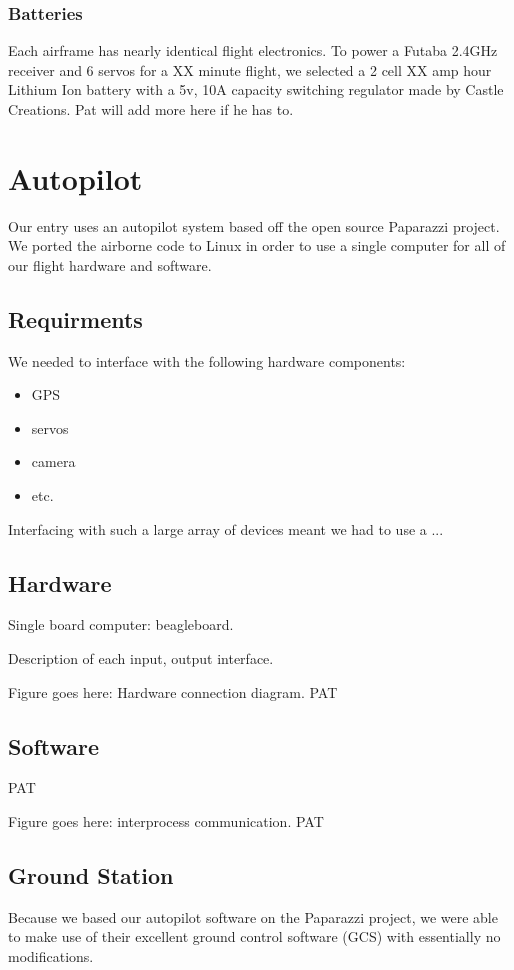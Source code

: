 \documentclass[10pt]{report}
\begin{document}
\subsubsection{Batteries}

Each airframe has nearly identical flight electronics. To power a Futaba 2.4GHz receiver and 6 servos for a XX minute flight, we selected a 2 cell XX amp hour Lithium Ion battery with a 5v, 10A capacity switching regulator made by Castle Creations. Pat will add more here if he has to.

\section{Autopilot}
Our entry uses an autopilot system based off the open source 
Paparazzi project\cite{paparazziweb}. 
We ported the airborne code to Linux in order to use a single computer for all of our flight hardware and software.

\subsection{Requirments}

We needed to interface with the following hardware components:
\begin{itemize}
	\setlength{\itemsep}{0cm}
	\setlength{\parskip}{0cm}
	\item GPS
	\item servos
	\item camera
	\item etc.
\end{itemize}

Interfacing with such a large array of devices meant we had to use a ...

\subsection{Hardware}
Single board computer: beagleboard.

Description of each input, output interface.

Figure goes here: Hardware connection diagram. PAT
\subsection{Software}
PAT

Figure goes here: interprocess communication. PAT
\subsection{Ground Station}
Because we based our autopilot software on the Paparazzi project, we were able to make use of their excellent ground control software (GCS) with essentially no modifications.
\end{document}
